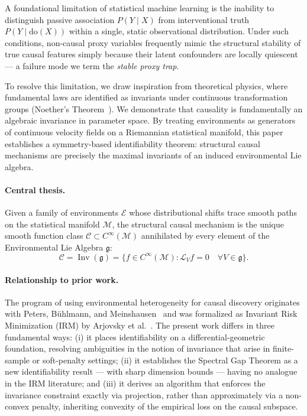 \documentclass[11pt,a4paper]{article}
\DeclareMathOperator{\Inv}{Inv}
\newcommand{\g}{\mathfrak{g}}
\newcommand{\cC}{\mathcal{C}}
\newcommand{\cM}{\mathcal{M}}
\newcommand{\cE}{\mathcal{E}}
\newcommand{\LP}{\mathcal{L}}
\begin{document}
A foundational limitation of statistical machine learning is the inability to distinguish passive association $P(Y \mid X)$ from interventional truth $P(Y \mid \mathrm{do}(X))$ within a single, static observational distribution. Under such conditions, non-causal proxy variables frequently mimic the structural stability of true causal features simply because their latent confounders are locally quiescent — a failure mode we term the \emph{stable proxy trap}.

To resolve this limitation, we draw inspiration from theoretical physics, where fundamental laws are identified as invariants under continuous transformation groups (Noether's Theorem~\cite{noether1918}). We demonstrate that causality is fundamentally an algebraic invariance in parameter space. By treating environments as generators of continuous velocity fields on a Riemannian statistical manifold, this paper establishes a symmetry-based identifiability theorem: structural causal mechanisms are precisely the maximal invariants of an induced environmental Lie algebra.

\paragraph{Central thesis.} Given a family of environments $\cE$ whose distributional shifts trace smooth paths on the statistical manifold $\cM$, the structural causal mechanism is the unique smooth function class $\cC \subset C^\infty(\cM)$ annihilated by every element of the Environmental Lie Algebra $\g$:
\[
\cC = \Inv(\g) = \{f \in C^\infty(\cM) : \LP_V f = 0 \quad \forall V \in \g\}.
\]

\paragraph{Relationship to prior work.} The program of using environmental heterogeneity for causal discovery originates with Peters, Bühlmann, and Meinshausen~\cite{peters2016} and was formalized as Invariant Risk Minimization (IRM) by Arjovsky et al.~\cite{arjovsky2019}. The present work differs in three fundamental ways: (i) it places identifiability on a differential-geometric foundation, resolving ambiguities in the notion of invariance that arise in finite-sample or soft-penalty settings; (ii) it establishes the Spectral Gap Theorem as a new identifiability result — with sharp dimension bounds — having no analogue in the IRM literature; and (iii) it derives an algorithm that enforces the invariance constraint exactly via projection, rather than approximately via a non-convex penalty, inheriting convexity of the empirical loss on the causal subspace.
\end{document}
